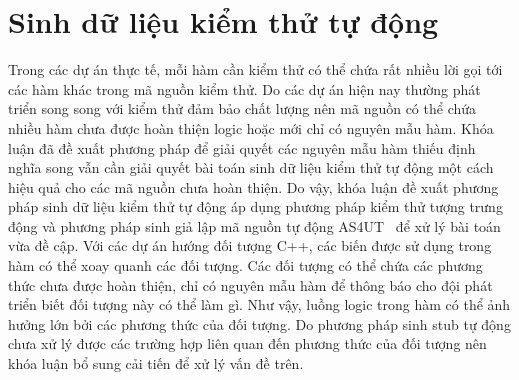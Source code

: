\section{Sinh dữ liệu kiểm thử tự động} \label{sec:autogen}
Trong các dự án thực tế, mỗi hàm cần kiểm thử có thể chứa rất nhiều lời gọi tới các hàm khác trong mã nguồn kiểm thử. Do các dự án hiện nay thường phát triển song song với kiểm thử đảm bảo chất lượng nên mã nguồn có thể chứa nhiều hàm chưa được hoàn thiện logic hoặc mới chỉ có nguyên mẫu hàm. Khóa luận đã đề xuất phương pháp để giải quyết các nguyên mẫu hàm thiếu định nghĩa song vẫn cần giải quyết bài toán sinh dữ liệu kiểm thử tự động một cách hiệu quả cho các mã nguồn chưa hoàn thiện. Do vậy, khóa luận đề xuất phương pháp sinh dữ liệu kiểm thử tự động áp dụng phương pháp kiểm thử tượng trưng động \cite{SDART, 9953784} và phương pháp sinh giả lập mã nguồn tự động AS4UT~\cite{TUNG2022106821} để xử lý bài toán vừa đề cập. Với các dự án hướng đối tượng C++, các biến được sử dụng trong hàm có thể xoay quanh các đối tượng. Các đối tượng có thể chứa các phương thức chưa được hoàn thiện, chỉ có nguyên mẫu hàm để thông báo cho đội phát triển biết đối tượng này có thể làm gì. Như vậy, luồng logic trong hàm có thể ảnh hưởng lớn bởi các phương thức của đối tượng. Do phương pháp sinh stub tự động chưa xử lý được các trường hợp liên quan đến phương thức của đối tượng nên khóa luận bổ sung cải tiến để xử lý vấn đề trên.

